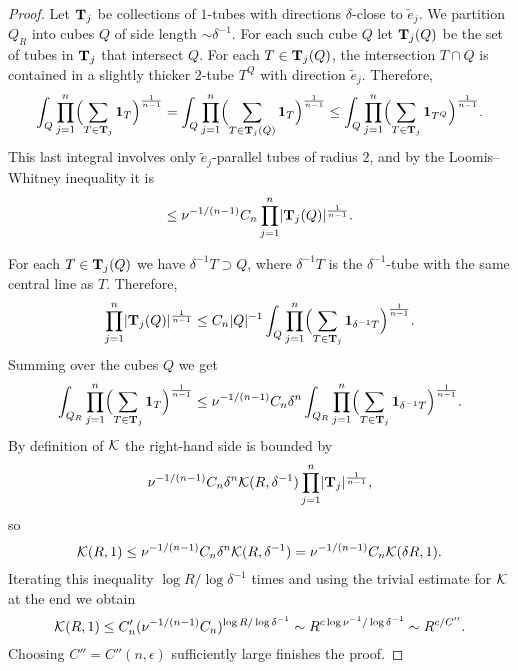 \begin{proof}
Let $\mathbf{T}_{j}$ be collections of $1$-tubes with directions $\delta$-close to $\tilde{e}_{j}$.
We partition $Q_R$ into cubes $Q$ of side length $\sim \delta^{-1}$.
For each such cube $Q$ let $\mathbf{T}_{j}(Q)$ be the set of tubes in $\mathbf{T}_{j}$ that intersect $Q$.
For each $T \in \mathbf{T}_{j}(Q)$, the intersection $T \cap Q$ is contained in a slightly thicker $2$-tube $T^{Q}$ with direction $\tilde{e}_{j}$.
Therefore,
\[
\int_{Q} \prod_{j=1}^n \Bigl( \sum_{T \in \mathbf{T}_{j}} \mathbf{1}_{T} \Bigr)^{\frac{1}{n-1}}
=
\int_{Q} \prod_{j=1}^n \Bigl( \sum_{T \in \mathbf{T}_{j}(Q)} \mathbf{1}_{T} \Bigr)^{\frac{1}{n-1}}
\leq
\int_{Q} \prod_{j=1}^n \Bigl( \sum_{T \in \mathbf{T}_{j}} \mathbf{1}_{T^{Q}} \Bigr)^{\frac{1}{n-1}}.
\]
This last integral involves only $\tilde{e}_{j}$-parallel tubes of radius $2$, and by the Loomis--Whitney inequality it is
\[
\le
\nu^{-1/(n-1)} C_n \prod_{j=1}^n \lvert\mathbf{T}_j(Q)\rvert^{\frac{1}{n-1}}.
\]
\begin{center}
\end{center}
For each $T \in \mathbf{T}_{j}(Q)$ we have $\delta^{-1} T \supset Q$, where $\delta^{-1} T$ is the $\delta^{-1}$-tube with the same central line as $T$.
Therefore,
\[
\prod_{j=1}^n \lvert\mathbf{T}_j(Q)\rvert^{\frac{1}{n-1}}
\le
C_n \lvert Q\rvert^{-1} \int_Q \prod_{j=1}^n \Bigl( \sum_{T \in \mathbf{T}_{j}} \mathbf{1}_{\delta^{-1}T} \Bigr)^{\frac{1}{n-1}}.
\]
Summing over the cubes $Q$ we get
\[
\int_{Q_{R}} \prod_{j=1}^n \Bigl( \sum_{T \in \mathbf{T}_{j}} \mathbf{1}_{T} \Bigr)^{\frac{1}{n-1}}
\leq
\nu^{-1/(n-1)} C_{n} \delta^{n} \int_{Q_{R}} \prod_{j=1}^n \Bigl( \sum_{T \in \mathbf{T}_{j}} \mathbf{1}_{\delta^{-1}T} \Bigr)^{\frac{1}{n-1}}.
\]
By definition of $\mathcal{K}$ the right-hand side is bounded by
\[
\nu^{-1/(n-1)} C_n \delta^{n} \mathcal{K}(R,\delta^{-1}) \prod_{j=1}^n \lvert\mathbf{T}_{j}\rvert^{\frac{1}{n-1}},
\]
so
\[
\mathcal{K}(R,1)
\leq
\nu^{-1/(n-1)} C_{n} \delta^{n} \mathcal{K}(R,\delta^{-1})
=
\nu^{-1/(n-1)} C_{n} \mathcal{K}(\delta R,1).
\]
Iterating this inequality $\log R/\log \delta^{-1}$ times and using the trivial estimate for $\mathcal{K}$ at the end we obtain
\[
\mathcal{K}(R,1) \leq
C'_{n} (\nu^{-1/(n-1)} C_{n})^{\log R/\log \delta^{-1}}
\sim
R^{c \log \nu^{-1}/\log \delta^{-1}}
\sim
R^{c/C''}.
\]
Choosing $C'' = C''(n,\epsilon)$ sufficiently large finishes the proof.
\end{proof}


